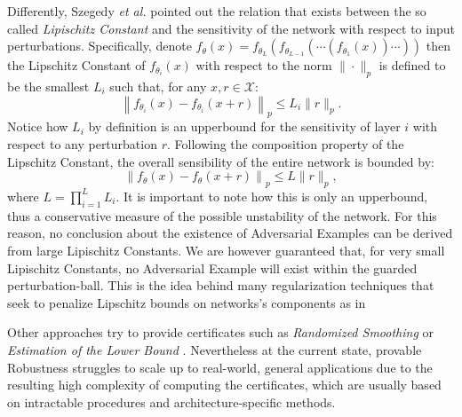 \documentclass[LaM,binding=0.6cm]{./packages/sapthesis/sapthesis}
\begin{document}
            Differently, Szegedy \textit{et al.} \cite{szegedy2013-intriguing} pointed out the relation that exists 
            between the so called \textit{Lipischitz Constant} and the sensitivity of the network 
            with respect to input perturbations. Specifically, denote $f_{\theta}(x) = f_{\theta_L}(f_{\theta_{L-1}}(\cdots (f_{\theta_{1}}(x))\cdots)) $
            then the Lipschitz Constant of  $f_{\theta_i}(x)$ with respect to the norm $ \|\cdot\|_p $ is defined to be
            the smallest $L_i$ such that, for any $x, r \in \mathcal{X}$:
            \begin{equation}
                \label{LC}
                \left\|f_{\theta_i}\left(x \right)-f_{\theta_i}\left(x+r\right)\right\|_p \leq L_{i}\|r\|_p .
            \end{equation}
            Notice how $L_i$ by definition is an upperbound for the sensitivity of layer $i$ with respect
            to any perturbation $r$. Following the composition property of the
            Lipschitz Constant, the overall sensibility of the entire network is bounded by:
            \begin{equation}
                \left\|f_{\theta}\left(x \right)-f_{\theta}\left(x+r\right)\right\|_p \leq L\|r\|_p,
            \end{equation}
            where $L=\prod_{i=1}^{L} L_{i}$. It is important to note how this is only an upperbound, thus a conservative
            measure of the possible unstability of the network. For this reason, no conclusion about the existence of 
            Adversarial Examples can be derived from large Lipischitz Constants. We are however guaranteed 
            that, for very small Lipischitz Constants, no Adversarial Example will exist within the guarded perturbation-ball. This is the idea behind 
            many regularization techniques that seek to penalize Lipschitz bounds on networks's components as 
            in \cite{lipschitz_train} 

            Other approaches try to provide certificates such as \textit{Randomized Smoothing} or \textit{Estimation of the Lower Bound} \cite{randomizedsmooth_cert} \cite{lowerbound_cert}
            . Nevertheless at the current state, provable Robustness struggles to scale up to real-world, general applications
            due to the resulting high complexity of computing the certificates, which are usually based on intractable procedures and architecture-specific methods.
\end{document}
